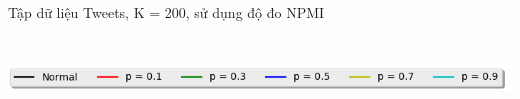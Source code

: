 \documentclass[pdf]{beamer}
\begin{document}
\begin{frame}{Tập dữ liệu Tweets, K = 200, sử dụng độ đo NPMI }
\begin{columns}[T] %
\begin{column}{.50\textwidth}
\begin{figure}
\end{figure}
\end{column} %
\hfill%
\begin{column}{.50\textwidth}
\begin{figure}
\end{figure}				
\end{column} %
\end{columns}
\begin{center}
\includegraphics[width=1\textwidth]{menu.png}	
\end{center}
\end{frame}
\end{document}
